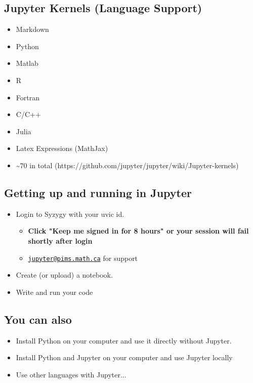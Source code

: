 \documentclass[11pt]{article}
\providecommand{\tightlist}{%
      \setlength{\itemsep}{0pt}\setlength{\parskip}{0pt}}
\begin{document}
    \subsection{Jupyter Kernels (Language
Support)}\label{jupyter-kernels-language-support}

\begin{itemize}
\tightlist
\item
  Markdown
\item
  Python
\item
  Matlab
\item
  R
\item
  Fortran
\item
  C/C++
\item
  Julia
\item
  Latex Expressions (MathJax)
\item
  \textasciitilde{}70 in total
  (https://github.com/jupyter/jupyter/wiki/Jupyter-kernels)
\end{itemize}

    \subsection{Getting up and running in
Jupyter}\label{getting-up-and-running-in-jupyter}

\begin{itemize}
\tightlist
\item
  Login to Syzygy with your uvic id.

  \begin{itemize}
  \tightlist
  \item
    \textbf{Click "Keep me signed in for 8 hours" or your session will
    fail shortly after login}
  \item
    \href{mailto:jupyter@pims.math.ca}{\nolinkurl{jupyter@pims.math.ca}}
    for support
  \end{itemize}
\item
  Create (or upload) a notebook.
\item
  Write and run your code
\end{itemize}

    \subsection{You can also}\label{you-can-also}

\begin{itemize}
\tightlist
\item
  Install Python on your computer and use it directly without Jupyter.
\item
  Install Python and Jupyter on your computer and use Jupyter locally
\item
  Use other languages with Jupyter...
\end{itemize}
\end{document}
